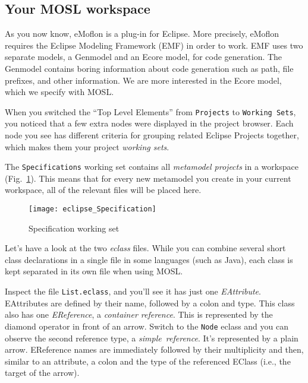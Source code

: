 \newpage
\texHeader
\hypertarget{projectStructure tex}{}
\subsection{Your MOSL workspace}

As you now know, eMoflon is a plug-in for Eclipse. More precisely, eMoflon requires the Eclipse Modeling Framework (EMF) in order to work. EMF uses two separate
models, a Genmodel and an Ecore model, for code generation. The Genmodel contains boring information about code generation such as path, file prefixes, and
other information. We are more interested in the Ecore model, which we specify with MOSL.

When you switched the ``Top Level Elements'' from \texttt{Projects} to \texttt{Working Sets}, you noticed that a few extra nodes were displayed in the project
browser. Each node you see has different criteria for grouping related Eclipse Projects together, which makes them your project \emph{working sets}.

The \texttt{Specifications} working set contains all \emph{metamodel projects} in a workspace (Fig.~\ref{eclipse:modelSpecification}). This means that for every
new metamodel you create in your current workspace, all of the relevant files will be placed here.

 \begin{figure}[htbp]
  \centering
  \texttt{[image: eclipse\_Specification]}
  \caption{Specification working set}
  \label{eclipse:modelSpecification}
\end{figure}
  
Let's have a look at the two \emph{eclass} files. While you can combine several short class declarations in a single file in some languages (such as Java),
each class is kept separated in its own file when using MOSL.

Inspect the file \texttt{List.eclass}, and you'll see it has just one \emph{EAttribute}. EAttributes are defined by their name, followed by a colon and type.
This class also has one \emph{EReference}, a \emph{container reference}. This is represented by the diamond operator in front of an arrow.
Switch to the \texttt{Node} eclass and you can observe the second reference type, a \emph{simple~reference}. It's represented by a plain arrow. EReference names are
immediately followed by their multiplicity and then, similar to an attribute, a colon and the type of the referenced EClass (i.e., the target of the arrow).

